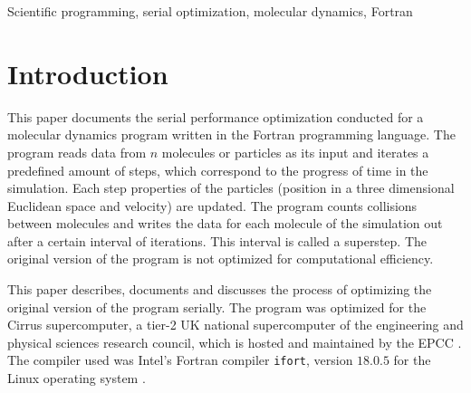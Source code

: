 \documentclass[twoside,11pt]{article}
\title{\titl}
\author{}
\begin{document}
\maketitle

\begin{abstract}
  This paper documents the serial optimization of a molecular dynamics
  program written in the Fortran programming language.
  The original version of the program took 1270 seconds to complete
  a simulation on the Cirrus supercomputer.
  The final version took 26 seconds to complete the same simulation.
  98\% of the runtime could be removed, simply by modernizing the
  source code and utilizing compiler optimizations.
  The main result of the optimization process is the observation that
  idiomatic, modern and easy-to-read Fortran code results not only in
  a far better performing program, but also in a more maintainable
  one.
  Utilizing the compiler properly was the main reason for the
  increased performance.
\end{abstract}

\begin{keywords}
Scientific programming, serial optimization, molecular dynamics,
Fortran
\end{keywords}

\section{Introduction} %
\label{sec:intro}

This paper documents the serial performance optimization conducted for
a molecular dynamics program written in the Fortran programming
language.
The program reads data from $n$ molecules or particles as its input
and iterates a predefined amount of steps, which correspond to the
progress of time in the simulation.
Each step properties of the particles (position in a three dimensional
Euclidean space and velocity) are updated.
The program counts collisions between molecules and writes the
data for each molecule of the simulation out after a certain interval
of iterations.
This interval is called a superstep.
The original version of the program is not optimized for computational
efficiency.

This paper describes, documents and discusses the process of
optimizing the original version of the program serially.
The program was optimized for the Cirrus supercomputer, a tier-2
UK national supercomputer of the engineering and physical sciences
research council, which is hosted and maintained by the EPCC
\citep{cirrus}.
The compiler used was Intel's Fortran compiler \texttt{ifort},
version $18.0.5$ for the Linux operating system
\citep{ifort18}.
\end{document}
